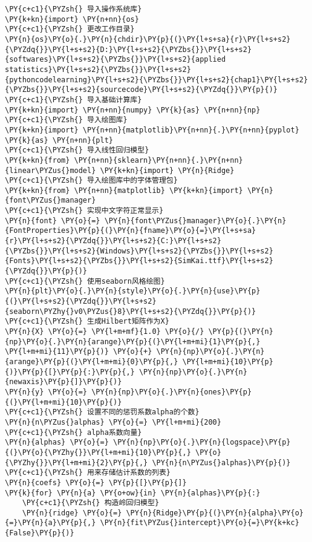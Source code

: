 \begin{Verbatim}[commandchars=\\\{\}]
\PY{c+c1}{\PYZsh{} 导入操作系统库}
\PY{k+kn}{import} \PY{n+nn}{os}
\PY{c+c1}{\PYZsh{} 更改工作目录}
\PY{n}{os}\PY{o}{.}\PY{n}{chdir}\PY{p}{(}\PY{l+s+sa}{r}\PY{l+s+s2}{\PYZdq{}}\PY{l+s+s2}{D:}\PY{l+s+s2}{\PYZbs{}}\PY{l+s+s2}{softwares}\PY{l+s+s2}{\PYZbs{}}\PY{l+s+s2}{applied statistics}\PY{l+s+s2}{\PYZbs{}}\PY{l+s+s2}{pythoncodelearning}\PY{l+s+s2}{\PYZbs{}}\PY{l+s+s2}{chap1}\PY{l+s+s2}{\PYZbs{}}\PY{l+s+s2}{sourcecode}\PY{l+s+s2}{\PYZdq{}}\PY{p}{)}
\PY{c+c1}{\PYZsh{} 导入基础计算库}
\PY{k+kn}{import} \PY{n+nn}{numpy} \PY{k}{as} \PY{n+nn}{np}
\PY{c+c1}{\PYZsh{} 导入绘图库}
\PY{k+kn}{import} \PY{n+nn}{matplotlib}\PY{n+nn}{.}\PY{n+nn}{pyplot} \PY{k}{as} \PY{n+nn}{plt}
\PY{c+c1}{\PYZsh{} 导入线性回归模型}
\PY{k+kn}{from} \PY{n+nn}{sklearn}\PY{n+nn}{.}\PY{n+nn}{linear\PYZus{}model} \PY{k+kn}{import} \PY{n}{Ridge}
\PY{c+c1}{\PYZsh{} 导入绘图库中的字体管理包}
\PY{k+kn}{from} \PY{n+nn}{matplotlib} \PY{k+kn}{import} \PY{n}{font\PYZus{}manager}
\PY{c+c1}{\PYZsh{} 实现中文字符正常显示}
\PY{n}{font} \PY{o}{=} \PY{n}{font\PYZus{}manager}\PY{o}{.}\PY{n}{FontProperties}\PY{p}{(}\PY{n}{fname}\PY{o}{=}\PY{l+s+sa}{r}\PY{l+s+s2}{\PYZdq{}}\PY{l+s+s2}{C:}\PY{l+s+s2}{\PYZbs{}}\PY{l+s+s2}{Windows}\PY{l+s+s2}{\PYZbs{}}\PY{l+s+s2}{Fonts}\PY{l+s+s2}{\PYZbs{}}\PY{l+s+s2}{SimKai.ttf}\PY{l+s+s2}{\PYZdq{}}\PY{p}{)}
\PY{c+c1}{\PYZsh{} 使用seaborn风格绘图}
\PY{n}{plt}\PY{o}{.}\PY{n}{style}\PY{o}{.}\PY{n}{use}\PY{p}{(}\PY{l+s+s2}{\PYZdq{}}\PY{l+s+s2}{seaborn\PYZhy{}v0\PYZus{}8}\PY{l+s+s2}{\PYZdq{}}\PY{p}{)}
\PY{c+c1}{\PYZsh{} 生成Hilbert矩阵作为X}
\PY{n}{X} \PY{o}{=} \PY{l+m+mf}{1.0} \PY{o}{/} \PY{p}{(}\PY{n}{np}\PY{o}{.}\PY{n}{arange}\PY{p}{(}\PY{l+m+mi}{1}\PY{p}{,} \PY{l+m+mi}{11}\PY{p}{)} \PY{o}{+} \PY{n}{np}\PY{o}{.}\PY{n}{arange}\PY{p}{(}\PY{l+m+mi}{0}\PY{p}{,} \PY{l+m+mi}{10}\PY{p}{)}\PY{p}{[}\PY{p}{:}\PY{p}{,} \PY{n}{np}\PY{o}{.}\PY{n}{newaxis}\PY{p}{]}\PY{p}{)}
\PY{n}{y} \PY{o}{=} \PY{n}{np}\PY{o}{.}\PY{n}{ones}\PY{p}{(}\PY{l+m+mi}{10}\PY{p}{)}
\PY{c+c1}{\PYZsh{} 设置不同的惩罚系数alpha的个数}
\PY{n}{n\PYZus{}alphas} \PY{o}{=} \PY{l+m+mi}{200}
\PY{c+c1}{\PYZsh{} alpha系数向量}
\PY{n}{alphas} \PY{o}{=} \PY{n}{np}\PY{o}{.}\PY{n}{logspace}\PY{p}{(}\PY{o}{\PYZhy{}}\PY{l+m+mi}{10}\PY{p}{,} \PY{o}{\PYZhy{}}\PY{l+m+mi}{2}\PY{p}{,} \PY{n}{n\PYZus{}alphas}\PY{p}{)}
\PY{c+c1}{\PYZsh{} 用来存储估计系数的列表}
\PY{n}{coefs} \PY{o}{=} \PY{p}{[}\PY{p}{]}
\PY{k}{for} \PY{n}{a} \PY{o+ow}{in} \PY{n}{alphas}\PY{p}{:}
    \PY{c+c1}{\PYZsh{} 构造岭回归模型}
    \PY{n}{ridge} \PY{o}{=} \PY{n}{Ridge}\PY{p}{(}\PY{n}{alpha}\PY{o}{=}\PY{n}{a}\PY{p}{,} \PY{n}{fit\PYZus{}intercept}\PY{o}{=}\PY{k+kc}{False}\PY{p}{)}

\end{Verbatim}
